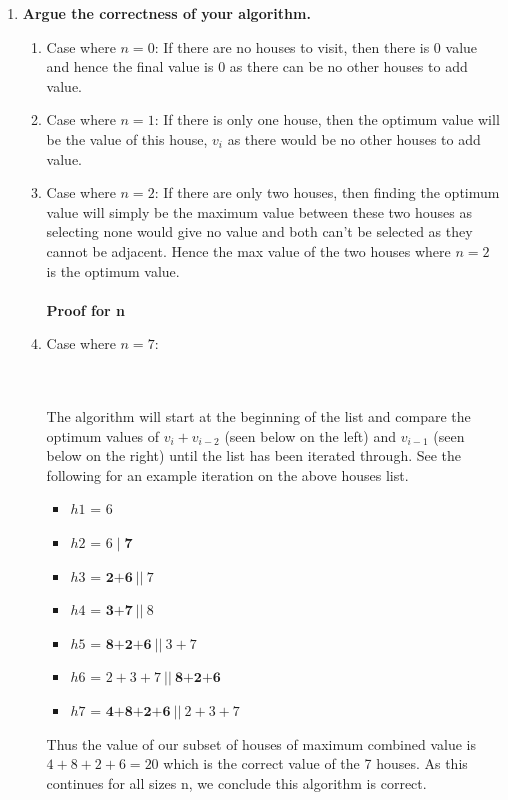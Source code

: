 \documentclass[11pt, oneside]{article}   	%
\begin{document}
\begin{enumerate}
\begin{enumerate}
\begin{enumerate}
		\end{enumerate}
		\newpage
		\item \textbf{Argue the correctness of your algorithm.}
		\begin{enumerate}
			\item Case where $n=0$: If there are no houses to visit, then there is 0 value and hence the final value is 0 as there can be no other houses to add value.
			\item Case where $n=1$: If there is only one house, then the optimum value will be the value of this house, $v_i$ as there would be no other houses to add value.
			\item Case where $n=2$: If there are only two houses, then finding the optimum value will simply be the maximum value between these two houses as selecting none would give no value and both can't be selected as they cannot be adjacent. Hence the max value of the two houses where $n=2$ is the optimum value.\\
			\\
			\textbf{Proof for n}
			\item Case where $n=7$:\\
			\\
			\\
			The algorithm will start at the beginning of the list and compare the optimum values of $v_i + v_{i-2}$ (seen below on the left) and $v_{i-1}$ (seen below on the right) until the list has been iterated through. See the following for an example iteration on the above houses list.
			\begin{itemize}
				\item $h1$ = 6
				\item $h2$ = $6\; |\; \textbf{7}$
				\item $h3$ = $\textbf{2+6}\:|| \:7$
				\item $h4$ = $\textbf{3+7}\:|| \:8$
				\item $h5$ = $\textbf{8+2+6}\:|| \:3+7$
				\item $h6$ = $2+3+7\:|| \:\textbf{8+2+6}$
				\item $h7$ = $\textbf{4+8+2+6}\:|| \:2+3+7$
			\end{itemize}
			Thus the value of our subset of houses of maximum combined value is $4+8+2+6=20$ which is the correct value of the 7 houses. As this continues for all sizes n, we conclude this algorithm is correct.
			

\end{enumerate}
\end{enumerate}
\end{enumerate}
\end{document}
